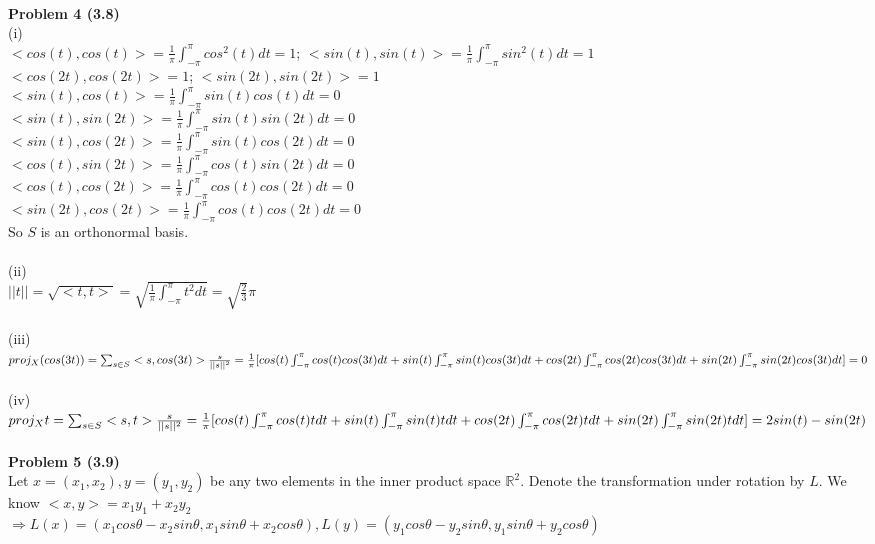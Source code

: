 \documentclass[letterpaper,12pt]{article}
\theoremstyle{definition}
\begin{document}
\\
\noindent\textbf{Problem 4 (3.8)}\\
(i) \\
$<cos(t), cos(t)>=\frac{1}{\pi}\int_{-\pi}^{\pi}cos^2(t)dt=1$; 
$<sin(t), sin(t)>=\frac{1}{\pi}\int_{-\pi}^{\pi}sin^2(t)dt=1$\\
$<cos(2t), cos(2t)>=1$; $<sin(2t), sin(2t)>=1$
\\
$<sin(t), cos(t)>=\frac{1}{\pi}\int_{-\pi}^{\pi}sin(t)cos(t)dt=0$\\
$<sin(t), sin(2t)>=\frac{1}{\pi}\int_{-\pi}^{\pi}sin(t)sin(2t)dt=0$\\
$<sin(t), cos(2t)>=\frac{1}{\pi}\int_{-\pi}^{\pi}sin(t)cos(2t)dt=0$\\
$<cos(t), sin(2t)>=\frac{1}{\pi}\int_{-\pi}^{\pi}cos(t)sin(2t)dt=0$\\
$<cos(t), cos(2t)>=\frac{1}{\pi}\int_{-\pi}^{\pi}cos(t)cos(2t)dt=0$\\
$<sin(2t), cos(2t)>=\frac{1}{\pi}\int_{-\pi}^{\pi}cos(t)cos(2t)dt=0$\\
So $S$ is an orthonormal basis.\\
\\
(ii)\\
$||t|| = \sqrt{<t, t>} = \sqrt{\frac{1}{\pi}\int_{-\pi}^{\pi}t^2dt} = \sqrt{\frac{2}{3}}\pi$\\
\\
(iii)\\
$proj_X(cos(3t)) = \sum_{s\in S}<s, cos(3t)>\frac{s}{||s||^2} =\\ \frac{1}{\pi}[cos(t)\int_{-\pi}^{\pi}cos(t)cos(3t)dt+sin(t)\int_{-\pi}^{\pi}sin(t)cos(3t)dt+cos(2t)\int_{-\pi}^{\pi}cos(2t)cos(3t)dt+sin(2t)\int_{-\pi}^{\pi}sin(2t)cos(3t)dt] = 0$
\\
\\
(iv)\\
$proj_Xt = \sum_{s\in S}<s, t>\frac{s}{||s||^2} =\\ \frac{1}{\pi}[cos(t)\int_{-\pi}^{\pi}cos(t)tdt+sin(t)\int_{-\pi}^{\pi}sin(t)tdt+cos(2t)\int_{-\pi}^{\pi}cos(2t)tdt+sin(2t)\int_{-\pi}^{\pi}sin(2t)tdt]=
2sin(t)-sin(2t)$
\\
\\
\noindent\textbf{Problem 5 (3.9)}\\
Let $x=(x_1, x_2), y=(y_1, y_2)$ be any two elements in the inner product space $\mathbb{R}^2$. Denote the transformation under rotation by $L$. We know $<x, y>=x_1y_1+x_2y_2$\\
$\Rightarrow L(x)=(x_1cos\theta-x_2sin\theta, x_1sin\theta+x_2cos\theta), L(y) = (y_1cos\theta-y_2sin\theta, y_1sin\theta+y_2cos\theta)$\\
\end{document}
